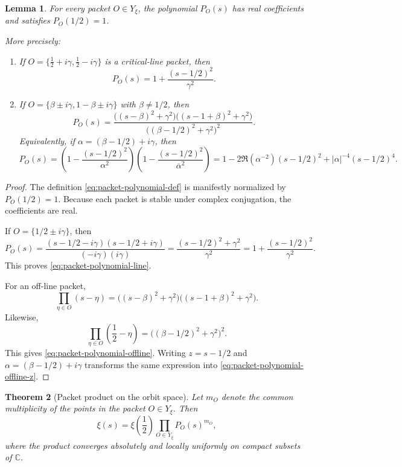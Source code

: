 \documentclass[11pt,a4paper]{article}
\newtheorem{theorem}{Theorem}[section]
\newtheorem{lemma}[theorem]{Lemma}
\theoremstyle{definition}
\theoremstyle{remark}
\newcommand{\CC}{\mathbb C}
\begin{document}
\begin{lemma}\label{lem:packet-polynomial-explicit}
For every packet $O\in Y_\xi$, the polynomial $P_O(s)$ has real coefficients and satisfies $P_O(1/2)=1$.

More precisely:
\begin{enumerate}[label=(\roman*)]
\item If $O=\{\frac12+i\gamma,\frac12-i\gamma\}$ is a critical-line packet, then
\begin{equation}\label{eq:packet-polynomial-line}
P_O(s)=1+\frac{(s-1/2)^2}{\gamma^2}.
\end{equation}
\item If $O=\{\beta\pm i\gamma,1-\beta\pm i\gamma\}$ with $\beta\neq 1/2$, then
\begin{equation}\label{eq:packet-polynomial-offline}
P_O(s)=\frac{\bigl((s-\beta)^2+\gamma^2\bigr)\bigl((s-1+\beta)^2+\gamma^2\bigr)}{\bigl((\beta-1/2)^2+\gamma^2\bigr)^2}.
\end{equation}
Equivalently, if $\alpha=(\beta-1/2)+i\gamma$, then
\begin{equation}\label{eq:packet-polynomial-offline-z}
P_O(s)=\left(1-\frac{(s-1/2)^2}{\alpha^2}\right)\left(1-\frac{(s-1/2)^2}{\overline\alpha^2}\right)
=1-2\Re(\alpha^{-2})(s-1/2)^2+|\alpha|^{-4}(s-1/2)^4.
\end{equation}
\end{enumerate}
\end{lemma}

\begin{proof}
The definition \eqref{eq:packet-polynomial-def} is manifestly normalized by $P_O(1/2)=1$.  Because each packet is stable under complex conjugation, the coefficients are real.

If $O=\{1/2\pm i\gamma\}$, then
\[
P_O(s)=\frac{(s-1/2-i\gamma)(s-1/2+i\gamma)}{(-i\gamma)(i\gamma)}
=\frac{(s-1/2)^2+\gamma^2}{\gamma^2}
=1+\frac{(s-1/2)^2}{\gamma^2}.
\]
This proves \eqref{eq:packet-polynomial-line}.

For an off-line packet,
\[
\prod_{\eta\in O}(s-\eta)=\bigl((s-\beta)^2+\gamma^2\bigr)\bigl((s-1+\beta)^2+\gamma^2\bigr).
\]
Likewise,
\[
\prod_{\eta\in O}\left(\frac12-\eta\right)=\bigl((\beta-1/2)^2+\gamma^2\bigr)^2.
\]
This gives \eqref{eq:packet-polynomial-offline}.  Writing $z=s-1/2$ and $\alpha=(\beta-1/2)+i\gamma$ transforms the same expression into \eqref{eq:packet-polynomial-offline-z}.
\end{proof}

\begin{theorem}[Packet product on the orbit space]\label{thm:packet-product-on-Y}
Let $m_O$ denote the common multiplicity of the points in the packet $O\in Y_\xi$.  Then
\begin{equation}\label{eq:packet-product-on-Y}
\xi(s)=\xi\!\left(\frac12\right)\prod_{O\in Y_\xi} P_O(s)^{m_O},
\end{equation}
where the product converges absolutely and locally uniformly on compact subsets of $\CC$.
\end{theorem}
\end{document}
